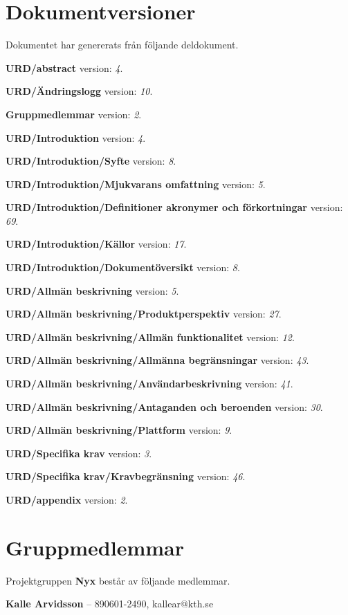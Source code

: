 \documentclass[a4paper, twoside, 11pt, titlepage]{article}
\begin{document}
\clearpage
\section*{Dokumentversioner}


Dokumentet har genererats från följande deldokument.

\textbf{URD/abstract} version: \emph{4}.

\textbf{URD/Ändringslogg} version: \emph{10}.

\textbf{Gruppmedlemmar} version: \emph{2}.

\textbf{URD/Introduktion} version: \emph{4}.

\textbf{URD/Introduktion/Syfte} version: \emph{8}.

\textbf{URD/Introduktion/Mjukvarans omfattning} version: \emph{5}.

\textbf{URD/Introduktion/Definitioner akronymer och förkortningar} version: \emph{69}.

\textbf{URD/Introduktion/Källor} version: \emph{17}.

\textbf{URD/Introduktion/Dokumentöversikt} version: \emph{8}.

\textbf{URD/Allmän beskrivning} version: \emph{5}.

\textbf{URD/Allmän beskrivning/Produktperspektiv} version: \emph{27}.

\textbf{URD/Allmän beskrivning/Allmän funktionalitet} version: \emph{12}.

\textbf{URD/Allmän beskrivning/Allmänna begränsningar} version: \emph{43}.

\textbf{URD/Allmän beskrivning/Användarbeskrivning} version: \emph{41}.

\textbf{URD/Allmän beskrivning/Antaganden och beroenden} version: \emph{30}.

\textbf{URD/Allmän beskrivning/Plattform} version: \emph{9}.

\textbf{URD/Specifika krav} version: \emph{3}.

\textbf{URD/Specifika krav/Kravbegränsning} version: \emph{46}.

\textbf{URD/appendix} version: \emph{2}.

\clearpage
\section*{Gruppmedlemmar}


Projektgruppen \textbf{Nyx} består av följande medlemmar.

\textbf{Kalle Arvidsson} -- 890601-2490, kallear@kth.se
\end{document}
